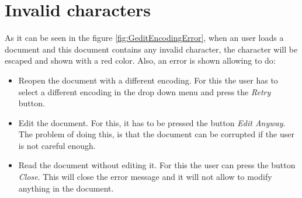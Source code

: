 
\chapter{Invalid characters}


As it can be seen in the figure \ref{fig:GeditEncodingError}, when an user loads a document and this document contains any invalid character, the character will be escaped and shown with a red color. Also, an error is shown allowing to do:
\begin{itemize}
  \item Reopen the document with a different encoding. For this the user has to select a different encoding in the drop down menu and press the \emph{Retry} button.
  \item Edit the document. For this, it has to be pressed the button \emph{Edit Anyway}. The problem of doing this, is that the document can be corrupted if the user is not careful enough.
  \item Read the document without editing it. For this the user can press the button \emph{Close}. This will close the error message and it will not allow to modify anything in the document.
\end{itemize}
